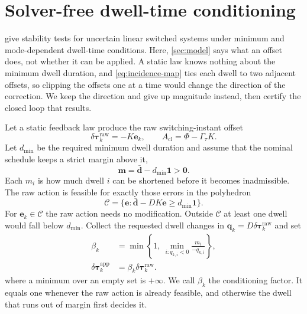 \documentclass[pdflatex,iicol,sn-mathphys-ay]{sn-jnl}
\newcommand{\vect}[1]{\bm{#1}}
\newcommand{\dtau}{\delta\vect{\tau}}
\begin{document}
\section{Solver-free dwell-time conditioning}
\label{sec:conditioning}

\cite{briat2013dwellTimes} give stability tests for uncertain linear switched systems under minimum and mode-dependent dwell-time conditions. Here, \cref{sec:model} says what an offset does, not whether it can be applied. A static law knows nothing about the minimum dwell duration, and \eqref{eq:incidence-map} ties each dwell to two adjacent offsets, so clipping the offsets one at a time would change the direction of the correction. We keep the direction and give up magnitude instead, then certify the closed loop that results.

Let a static feedback law produce the raw switching-instant offset
\begin{equation}
    \dtau_k^{\mathrm{raw}}=-K\vect{e}_k,
    \qquad A_{\mathrm{cl}}=\Phi-\Gamma_\tau K.
    \label{eq:raw-law}
\end{equation}
Let $d_{\min}$ be the required minimum dwell duration and assume that the nominal schedule keeps a strict margin above it,
\begin{equation}
    \vect{m}=\bar{\vect{d}}-d_{\min}\vect{1}>\vect{0}.
    \label{eq:strict-margin}
\end{equation}
Each $m_i$ is how much dwell $i$ can be shortened before it becomes inadmissible. The raw action is feasible for exactly those errors in the polyhedron
\begin{equation}
    \mathcal C=\{\vect{e}:\bar{\vect{d}}-DK\vect{e}
    \ge d_{\min}\vect{1}\}.
    \label{eq:admissible-region}
\end{equation}
For $\vect{e}_k\in\mathcal C$ the raw action needs no modification. Outside $\mathcal C$ at least one dwell would fall below $d_{\min}$. Collect the requested dwell changes in $\vect{q}_k=D\dtau_k^{\mathrm{raw}}$ and set
\begin{equation}
\begin{aligned}
    \beta_k&=\min\left\{1,\ \min_{i:q_{k,i}<0}
    \frac{m_i}{-q_{k,i}}\right\},\\
    \dtau_k^{\mathrm{app}}&=\beta_k\dtau_k^{\mathrm{raw}}.
\end{aligned}
\label{eq:conditioner}
\end{equation}
where a minimum over an empty set is $+\infty$. We call $\beta_k$ the conditioning factor. It equals one whenever the raw action is already feasible, and otherwise the dwell that runs out of margin first decides it.
\end{document}
